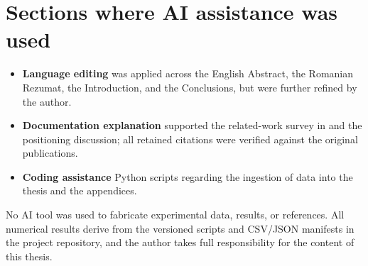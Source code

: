 \section*{Sections where AI assistance was used}
\begin{itemize}[noitemsep]
  \item \textbf{Language editing} was applied across the English Abstract, the Romanian Rezumat, the Introduction, and the Conclusions, but were further refined by the author.
  \item \textbf{Documentation explanation} supported the related-work survey in  and the positioning discussion; all retained citations were verified against the original publications.
  \item \textbf{Coding assistance} Python scripts regarding the ingestion of data into the thesis  and the appendices.
\end{itemize}

No AI tool was used to fabricate experimental data, results, or references. All numerical results derive from the versioned scripts and CSV/JSON manifests in the project repository, and the author takes full responsibility for the content of this thesis.
